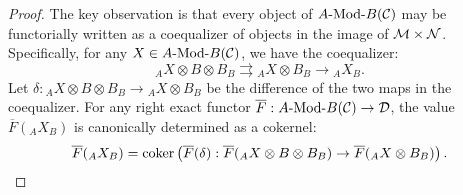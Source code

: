 \documentclass{amsart}
\begin{document}
\begin{proof}
The key observation is that every object of $\Mod{A}{B}(\cC)$ may be functorially written as a coequalizer of objects in the image of $\mathcal M \times \mathcal N$. Specifically, for any $X \in \Mod{A}{B}(\cC)$, we have the coequalizer:
\begin{equation*}
	{}_A X \otimes B \otimes B_B \rightrightarrows {}_A X \otimes B_B \to {}_A X_B.
\end{equation*}
Let %
$\delta: {}_A X \otimes B \otimes B_B \to {}_A X\otimes B_B$ 
be the difference of the two maps in the coequalizer. 
For any right exact functor $\overline{F}: \Mod{A}{B}(\cC) \to \cD$, the value $\overline{F}({}_A X_B)$ is canonically determined as a cokernel:
\begin{equation*}
	\overline{F}({}_A X_B) = \operatorname*{coker} \left( \overline{F}(\delta): \overline{F}( {}_A X \otimes B \otimes B_B) \to \overline{F}({}_A X \otimes B_B) \right).
\end{equation*} 
	

\end{proof}
\end{document}
